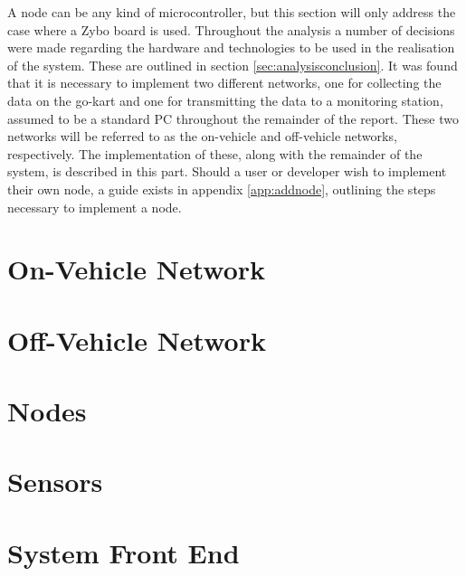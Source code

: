 
A node can be any kind of microcontroller, but this section will only address the case where a Zybo board is used. 
Throughout the analysis a number of decisions were made regarding the hardware and technologies to be used in the realisation of the system.
These are outlined in section \ref{sec:analysisconclusion}.
It was found that it is necessary to implement two different networks, one for collecting the data on the go-kart and one for transmitting the data to a monitoring station, assumed to be a standard PC throughout the remainder of the report.
These two networks will be referred to as the on-vehicle and off-vehicle networks, respectively.
The implementation of these, along with the remainder of the system, is described in this part.
Should a user or developer wish to implement their own node, a guide exists in appendix \ref{app:addnode}, outlining the steps necessary to implement a node.
\section{On-Vehicle Network}






\section{Off-Vehicle Network}
\label{sec:wifi}

\section{Nodes}

\section{Sensors}

\section{System Front End}
